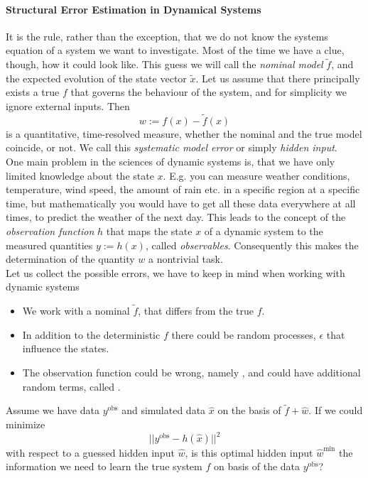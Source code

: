 \paragraph*{Structural Error Estimation in Dynamical Systems}
It is the rule, rather than the exception, that we do not know the systems equation of a system we want 
to investigate. Most of the time we have a clue, though, how it could look like. This guess we will call the 
\textit{nominal model} $\tilde{f}$, and the expected evolution of the state vector $\tilde{x}$. Let us assume 
that there principally exists a true $f$ that governs the behaviour of the system, and for simplicity we ignore external inputs. Then 
\begin{equation}
	w := f(x) - \tilde{f}(x)
\end{equation} 
is a quantitative, time-resolved measure, whether the nominal and the true model coincide, or not. We call 
this \textit{systematic model error} or simply \textit{hidden input}. \\

One main problem in the sciences of dynamic systems is, that we have only limited knowledge about the state $x$. 
E.g. you can measure weather conditions, temperature, wind speed, the amount of rain etc. in a specific region 
at a specific time, but mathematically you would have to get all these data everywhere at all times, to 
predict the weather of the next day. This leads to the concept of the \textit{observation function} $h$ that maps 
the state $x$ of a dynamic system to the measured quantities $y:=h(x)$, called \textit{observables}. Consequently 
this makes the determination of the quantity $w$ a nontrivial task.  \\

Let us collect the possible errors, we have to keep in mind when working with dynamic systems
\begin{itemize}
	\item We work with a nominal $\tilde{f}$, that differs from the true $f$.
	\item In addition to the deterministic $f$ there could be random processes, $\epsilon$ that influence 
	the states.
	\item The observation function could be wrong, namely  , and could have 
	additional random terms, called .
\end{itemize}

Assume we have data $y^\text{obs}$ and simulated data $\hat{x}$ on the basis of $\tilde{f}+\hat{w}$. If 
we could minimize
\begin{equation}
	||y^\text{obs} - h(\hat{x})||^2
\end{equation}
with respect to a guessed hidden input $\hat{w}$, is this optimal hidden input $\hat{w}^\text{min}$ the 
information we need to learn the true system $f$ on basis of the data $y^\text{obs}$? \\

